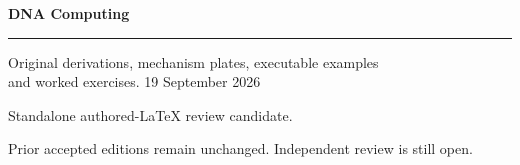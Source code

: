 \documentclass[11pt,oneside,openany]{book}
\begin{document}
\frontmatter
\begin{titlepage}
\color{Blue}\sffamily\vspace*{20mm}
{\Huge\bfseries DNA Computing\par}
\vspace{10mm}{\LARGE Chapter 6\par}
\vspace{8mm}{\Large Hybridization thermodynamics\par}
\vspace{12mm}\rule{\linewidth}{.8pt}
\vspace{6mm}\par Original derivations, mechanism plates, executable examples\\and worked exercises.
\vfill 19 September 2026\par
Standalone authored-LaTeX review candidate.\par
Prior accepted editions remain unchanged. Independent review is still open.
\end{titlepage}
\tableofcontents
\mainmatter
\setcounter{chapter}{5}

\backmatter

\printindex
\end{document}
